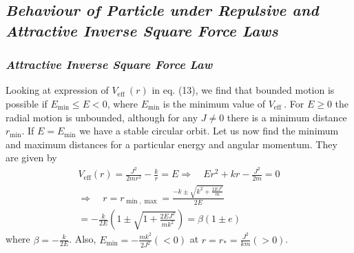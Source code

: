 \documentclass[conference]{IEEEtran}
\begin{document}
\subsection{\normalsize{\emph{\textbf{Behaviour of Particle under Repulsive and Attractive Inverse Square Force Laws}}}}

\subsubsection{\normalsize{\emph{\textbf{Attractive Inverse Square Force Law}}}}
Looking at expression of $V_{\text {eff }}(r)$ in eq. (13), we find that bounded motion is possible if $E_{\min } \leq E<0$, where $E_{\min }$ is the minimum value of $V_{\text {eff }}$. For $E \geq 0$ the radial motion is unbounded, although for any $J \neq 0$ there is a minimum distance $r_{\min }$. If $E=E_{\min }$ we have a stable circular orbit. Let us now find the minimum and maximum distances for a particular energy and
angular momentum. They are given by \begin{dmath}
\begin{array}{c}
V_{\mathrm{eff}}(r)=\frac{J^{2}}{2 m r^{2}}-\frac{k}{r}=E \Rightarrow \quad E r^{2}+k r-\frac{J^{2}}{2 m}=0 \\
\Rightarrow \quad r=r_{\min , \max }=\frac{-k \pm \sqrt{k^{2}+\frac{2 E J^{2}}{m}}}{2 E} \\
=-\frac{k}{2 E}\left(1 \pm \sqrt{1+\frac{2 E J^{2}}{m k^{2}}}\right) =\beta(1 \pm e)
\end{array}
\end{dmath} where $\beta=-\frac{k}{2 E}$. Also, $E_{\min }=-\frac{mk^{2}}{2 J^{2}}(<0)$ at $r = r_{*} = \frac{J^{2}}{km}(>0)$. 
\vspace{1em}
\end{document}
